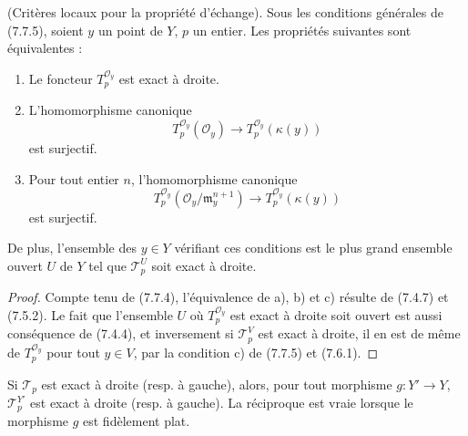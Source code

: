\begin{proposition}[7.7.10]
\textnormal{(Critères locaux pour la propriété d'échange).} Sous les conditions
générales de (7.7.5), soient $y$ un point de $Y$, $p$ un entier. Les propriétés
suivantes sont équivalentes :
\begin{enumerate}
  \item[a)] Le foncteur $T_p^{\mathscr O_y}$ est exact à droite.

  \item[b)] L'homomorphisme canonique
    \[
      T_p^{\mathscr O_y}(\mathscr O_y)
      \longrightarrow
      T_p^{\mathscr O_y}(\kappa(y))
    \]
    est surjectif.

  \item[c)] Pour tout entier $n$, l'homomorphisme canonique
    \[
      T_p^{\mathscr O_y}
      (\mathscr O_y/\mathfrak m_y^{n+1})
      \longrightarrow
      T_p^{\mathscr O_y}(\kappa(y))
    \]
    est surjectif.
\end{enumerate}
De plus, l'ensemble des $y\in Y$ vérifiant ces conditions est le plus grand
ensemble ouvert $U$ de $Y$ tel que $\mathscr T_p^U$ soit exact à droite.
\end{proposition}

\begin{proof}
Compte tenu de (7.7.4), l'équivalence de a), b) et c) résulte de (7.4.7) et
(7.5.2). Le fait que l'ensemble $U$ où $T_p^{\mathscr O_y}$ est exact à droite
soit ouvert est aussi conséquence de (7.4.4), et inversement si
$\mathscr T_p^V$ est exact à droite, il en est de même de
$T_p^{\mathscr O_y}$ pour tout $y\in V$, par la condition c) de (7.7.5) et
(7.6.1).
\end{proof}

\begin{corollary}[7.7.11]
Si $\mathscr T_p$ est exact à droite (resp. à gauche), alors, pour tout morphisme
$g:Y'\to Y$, $\mathscr T_p^{Y'}$ est exact à droite (resp. à gauche). La
réciproque est vraie lorsque le morphisme $g$ est fidèlement plat.
\end{corollary}

